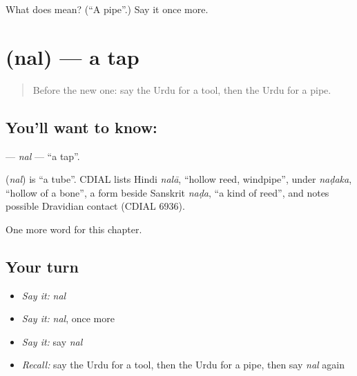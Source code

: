 \begin{tcolorbox}[breakable,colback=teal!4,colframe=teal!35!black,title={Before you move on}]
What does  mean? (\textquotedblleft{}A pipe\textquotedblright{}.) Say it once more.
\end{tcolorbox}
\section[\texorpdfstring{\ur{نل} (nal)}{نل (nal)}]{ (nal) — a tap}

\label{lesson:UR-C258-nal}



\begin{quote}
Before the new one: say the Urdu for a tool, then the Urdu for a pipe.
\end{quote}

\subsection*{You'll want to know: }
\textbf{} — \emph{nal} — \textquotedblleft{}a tap\textquotedblright{}.

\begin{cousinweb}
\textbf{} (\emph{nal}) is \textquotedblleft{}a tube\textquotedblright{}. CDIAL lists Hindi \emph{nalā}, \textquotedblleft{}hollow reed, windpipe\textquotedblright{}, under \emph{naḍaka}, \textquotedblleft{}hollow of a bone\textquotedblright{}, a form beside Sanskrit \emph{naḍa}, \textquotedblleft{}a kind of reed\textquotedblright{}, and notes possible Dravidian contact (CDIAL 6936).
\end{cousinweb}

\begin{grammarlens}[title={What you've built}]
One more word for this chapter.
\end{grammarlens}

\subsection*{Your turn}
\begin{itemize}
\raggedright
  \item \emph{Say it:} \emph{nal}
  \item \emph{Say it:} \emph{nal}, once more
  \item \emph{Say it:} say \emph{nal}
  \item \emph{Recall:} say the Urdu for a tool, then the Urdu for a pipe, then say \emph{nal} again
\end{itemize}

